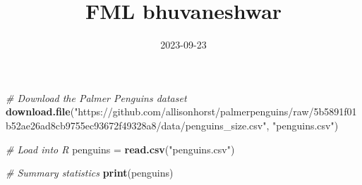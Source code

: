 \documentclass[
]{article}
\title{FML bhuvaneshwar}
\author{}
\date{\vspace{-2.5em}2023-09-23}
\newenvironment{Shaded}{\begin{snugshade}}{\end{snugshade}}
\newcommand{\CommentTok}[1]{\textcolor[rgb]{0.56,0.35,0.01}{\textit{#1}}}
\newcommand{\FunctionTok}[1]{\textcolor[rgb]{0.13,0.29,0.53}{\textbf{#1}}}
\newcommand{\NormalTok}[1]{#1}
\newcommand{\OtherTok}[1]{\textcolor[rgb]{0.56,0.35,0.01}{#1}}
\newcommand{\StringTok}[1]{\textcolor[rgb]{0.31,0.60,0.02}{#1}}
\begin{document}
\maketitle

\begin{Shaded}
\begin{Highlighting}[]
\CommentTok{\# Download the Palmer Penguins dataset}
\FunctionTok{download.file}\NormalTok{(}\StringTok{"https://github.com/allisonhorst/palmerpenguins/raw/5b5891f01b52ae26ad8cb9755ec93672f49328a8/data/penguins\_size.csv"}\NormalTok{, }\StringTok{"penguins.csv"}\NormalTok{)}

\CommentTok{\# Load into R }
\NormalTok{penguins }\OtherTok{=} \FunctionTok{read.csv}\NormalTok{(}\StringTok{"penguins.csv"}\NormalTok{)}

\CommentTok{\# Summary statistics}
\FunctionTok{print}\NormalTok{(penguins)}
\end{Highlighting}
\end{Shaded}
\end{document}
